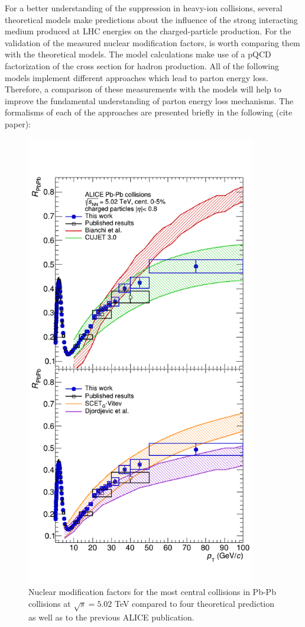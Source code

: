 \documentclass[12pt,a4paper]{report}
\begin{document}
For a better understanding of the suppression in heavy-ion collisions, several theoretical models make predictions about the influence of the strong interacting medium produced at LHC energies on the charged-particle production. For the validation of the measured nuclear modification factors, is worth comparing them with the theoretical models. The model calculations make use of a pQCD factorization of the cross section for hadron production. All of the following models implement different approaches which lead to parton energy loss. Therefore, a comparison of these measurements with the models will help to improve the fundamental understanding of parton energy loss mechanisms. The formalisms of each of the approaches are presented briefly in the following (cite paper):
\begin{figure}[tb!]
\centering
\includegraphics[width=10cm]{Plots/Raatheo.png}  
\caption{Nuclear modification factors for the most central collisions in Pb-Pb collisions at $\sqrt{s}=5.02$ TeV compared to four theoretical prediction as well as to the previous ALICE publication.}
\label{raatheo}
\end{figure}
\end{document}
